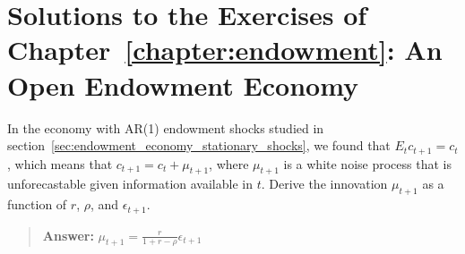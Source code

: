 \setcounter{chapter}{2}
\renewcommand{\theequation}{\thechapter.\arabic{equation}EX}
\setcounter{equation}{0}
\setcounter{page}{1}
\chapter*{Solutions to the Exercises of Chapter~\ref{chapter:endowment}: An  Open  Endowment Economy }

\setcounter{section}{5}
\setcounter{exercise}{0}
\singlespacing

\begin{exercise}
In the economy with AR(1) endowment shocks studied in section~\ref{sec:endowment_economy_stationary_shocks}, we found that $E_tc_{t+1}=c_t$,  which means that $c_{t+1} = c_t + \mu_{t+1}$, where $\mu_{t+1}$ is a white noise process that is unforecastable given information available in $t$. Derive the innovation $\mu_{t+1}$ as a function of $r$, $\rho$, and $\epsilon_{t+1}$. 
\begin{quote}
{\bf  Answer:} $\mu_{t+1} = \frac{r}{1+r-\rho} \epsilon_{t+1}$
\end{quote}
\end{exercise}

